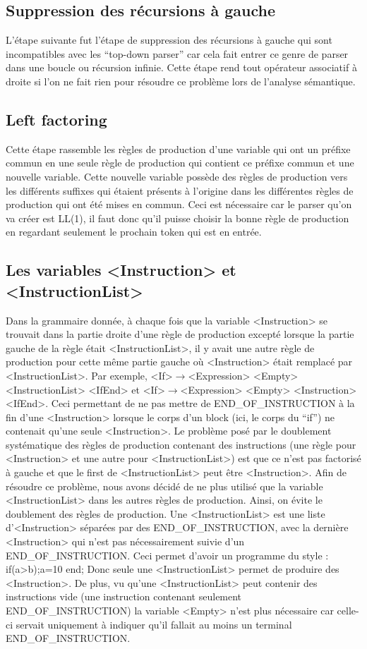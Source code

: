 \documentclass[a4paper,10pt]{article}
\begin{document}
\subsection{Suppression des récursions à gauche}
L'étape suivante fut l'étape de suppression des récursions à gauche qui sont incompatibles avec les ``top-down parser'' car cela fait entrer ce genre de parser dans une boucle ou récursion infinie. Cette étape rend tout opérateur associatif à droite si l'on ne fait rien pour résoudre ce problème lors de l'analyse sémantique.
\subsection{Left factoring}
Cette étape rassemble les règles de production d'une variable qui ont un préfixe commun en une seule règle de production qui contient ce préfixe commun et une nouvelle variable. Cette nouvelle variable possède des règles de production vers les différents suffixes qui étaient présents à l'origine dans les différentes règles de production qui ont été mises en commun. Ceci est nécessaire car le parser qu'on va créer est LL(1), il faut donc qu'il puisse choisir la bonne règle de production en regardant seulement le prochain token qui est en entrée.
\subsection{Les variables <Instruction> et <InstructionList>}
Dans la grammaire donnée, à chaque fois que la variable <Instruction> se trouvait dans la partie droite d'une règle de production excepté lorsque la partie gauche de la règle était <InstructionList>, il y avait une autre règle de production pour cette même partie gauche où <Instruction> était remplacé par <InstructionList>. Par exemple, <If>$\rightarrow$<Expression> <Empty> <InstructionList> <IfEnd> et <If>$\rightarrow$<Expression> <Empty> <Instruction> <IfEnd>. Ceci permettant de ne pas mettre de END\_OF\_INSTRUCTION à la fin d'une <Instruction> lorsque le corps d'un block (ici, le corps du ``if'') ne contenait qu'une seule <Instruction>. 
Le problème posé par le doublement systématique des règles de production contenant des instructions (une règle pour <Instruction> et une autre pour <InstructionList>) est que ce n'est pas factorisé à gauche et que le first de <InstructionList> peut être <Instruction>. 
Afin de résoudre ce problème, nous avons décidé de ne plus utilisé que la variable <InstructionList> dans les autres règles de production. Ainsi, on évite le doublement des règles de production.
Une <InstructionList> est une liste d'<Instruction> séparées par des END\_OF\_INSTRUCTION, avec la dernière <Instruction> qui n'est pas nécessairement suivie d'un END\_OF\_INSTRUCTION. Ceci permet d'avoir un programme du style : if(a>b);a=10 end;
Donc seule une <InstructionList> permet de produire des <Instruction>.
De plus, vu qu'une <InstructionList> peut contenir des instructions vide (une instruction contenant seulement END\_OF\_INSTRUCTION) la variable <Empty> n'est plus nécessaire car celle-ci servait uniquement à indiquer qu'il fallait au moins un terminal END\_OF\_INSTRUCTION.
\end{document}
